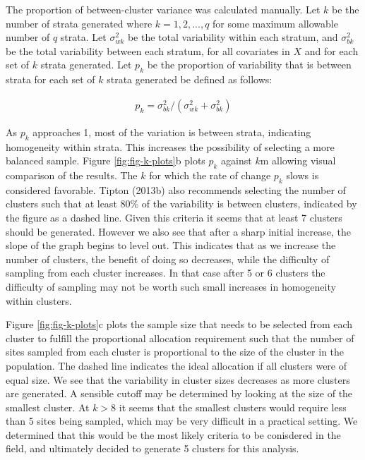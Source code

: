 \documentclass[man,floatsintext]{apa6}
\begin{document}
The proportion of between-cluster variance was calculated manually. Let \(k\) be the number of strata generated where \(k = 1, 2, ..., q\) for some maximum allowable number of \(q\) strata. Let \(\sigma_{wk}^2\) be the total variability within each stratum, and \(\sigma_{bk}^2\) be the total variability between each stratum, for all covariates in \(X\) and for each set of \(k\) strata generated. Let \(p_k\) be the proportion of variability that is between strata for each set of \(k\) strata generated be defined as follows:

\begin{align} \label{eq:pk}
  p_k = \sigma_{bk}^2/(\sigma_{wk}^2 + \sigma_{bk}^2)
\end{align}

As \(p_k\) approaches 1, most of the variation is between strata, indicating homogeneity within strata. This increases the possibility of selecting a more balanced sample. Figure \ref{fig:fig-k-plots}b plots \(p_k\) against \(k\)m allowing visual comparison of the results. The \(k\) for which the rate of change \(p_k\) slows is considered favorable. Tipton (2013b) also recommends selecting the number of clusters such that at least 80\% of the variability is between clusters, indicated by the figure as a dashed line. Given this criteria it seems that at least 7 clusters should be generated. However we also see that after a sharp initial increase, the slope of the graph begins to level out. This indicates that as we increase the number of clusters, the benefit of doing so decreases, while the difficulty of sampling from each cluster increases. In that case after 5 or 6 clusters the difficulty of sampling may not be worth such small increases in homogeneity within clusters.

Figure \ref{fig:fig-k-plots}c plots the sample size that needs to be selected from each cluster to fulfill the proportional allocation requirement such that the number of sites sampled from each cluster is proportional to the size of the cluster in the population. The dashed line indicates the ideal allocation if all clusters were of equal size. We see that the variability in cluster sizes decreases as more clusters are generated. A sensible cutoff may be determined by looking at the size of the smallest cluster. At \(k > 8\) it seems that the smallest clusters would require less than 5 sites being sampled, which may be very difficult in a practical setting. We determined that this would be the most likely criteria to be conisdered in the field, and ultimately decided to generate 5 clusters for this analysis.
\end{document}
